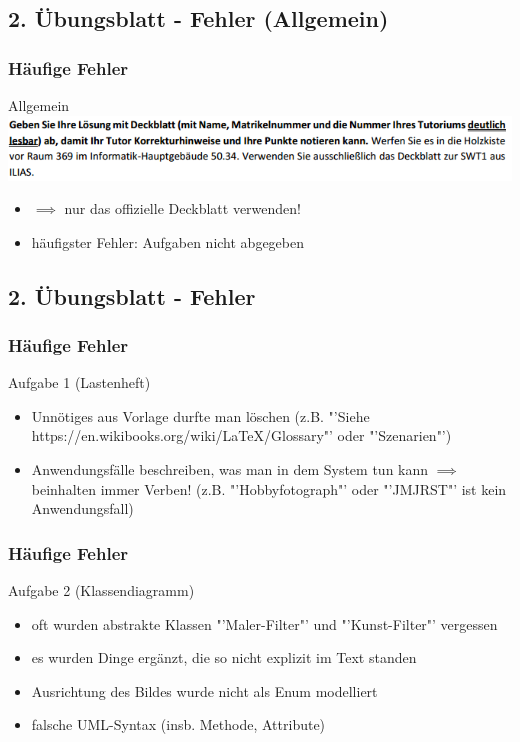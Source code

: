 \documentclass[18pt]{beamer}
\begin{document}
	
	\subsection{2. Übungsblatt - Fehler (Allgemein)}
	\begin{frame}
		\frametitle{Häufige Fehler}
		\begin{block}{Allgemein}
			\includegraphics[scale=0.6]{./pics/tut2/deckblatt.png}
			\begin{itemize}
				\item $\implies$ nur das offizielle Deckblatt verwenden!
				\pause
				\item häufigster Fehler: Aufgaben nicht abgegeben
			\end{itemize}
		\end{block}
	\end{frame}
	
	\subsection{2. Übungsblatt - Fehler}
	\begin{frame}
		\frametitle{Häufige Fehler}
		\begin{block}{Aufgabe 1 (Lastenheft)}
			\begin{itemize}
				\item Unnötiges aus Vorlage durfte man löschen (z.B. "'Siehe https://en.wikibooks.org/wiki/LaTeX/Glossary"' oder "'Szenarien"')
				\pause
				\item Anwendungsfälle beschreiben, was man in dem System tun kann 
				\linebreak $\implies$ beinhalten immer Verben! (z.B. "'Hobbyfotograph"' oder "'JMJRST"' ist kein Anwendungsfall)
			\end{itemize}
		\end{block}
	\end{frame}

	\begin{frame}
		\frametitle{Häufige Fehler}
		\begin{block}{Aufgabe 2 (Klassendiagramm)}
			\begin{itemize}
				\item oft wurden abstrakte Klassen "'Maler-Filter"' und "'Kunst-Filter"' vergessen
				\pause
				\item es wurden Dinge ergänzt, die so nicht explizit im Text standen
				\pause
				\item Ausrichtung des Bildes wurde nicht als Enum modelliert
				\pause
				\item falsche UML-Syntax (insb. Methode, Attribute)
			\end{itemize}
		\end{block}
	\end{frame}
\end{document}
